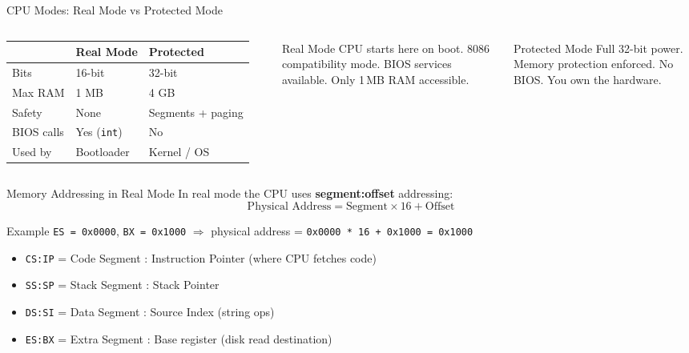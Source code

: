 \documentclass[aspectratio=169]{beamer}
\newcommand{\concept}[2]{%
  \begin{block}{#1}\smallskip #2\smallskip\end{block}\vspace{5pt}}
\begin{document}
\begin{frame}{CPU Modes: Real Mode vs Protected Mode}
  \begin{columns}[T]
    \begin{tabular}{lll}
      \toprule
      & \textbf{Real Mode} & \textbf{Protected}\\
      \midrule
      Bits        & 16-bit           & 32-bit\\
      Max RAM     & 1 MB             & 4 GB\\
      Safety      & None             & Segments + paging\\
      BIOS calls  & Yes (\texttt{int})& No\\
      Used by     & Bootloader       & Kernel / OS\\
      \bottomrule
    \end{tabular}
    \concept{Real Mode}{
      CPU starts here on boot. 8086 compatibility mode. BIOS services available. Only 1\,MB RAM accessible.
    }
    \concept{Protected Mode}{
      Full 32-bit power. Memory protection enforced. No BIOS. You own the hardware.
    }
  \end{columns}
\end{frame}

\begin{frame}{Memory Addressing in Real Mode}
  In real mode the CPU uses \textbf{segment:offset} addressing:
  \[
    \text{Physical Address} = \text{Segment} \times 16 + \text{Offset}
  \]
  \begin{exampleblock}{Example}
    \texttt{ES = 0x0000}, \texttt{BX = 0x1000} $\Rightarrow$ physical address = \texttt{0x0000 * 16 + 0x1000 = 0x1000}
  \end{exampleblock}
  \vspace{4pt}
  \begin{itemize}
    \item \texttt{CS:IP} = Code Segment : Instruction Pointer (where CPU fetches code)
    \item \texttt{SS:SP} = Stack Segment : Stack Pointer
    \item \texttt{DS:SI} = Data Segment : Source Index (string ops)
    \item \texttt{ES:BX} = Extra Segment : Base register (disk read destination)
  \end{itemize}
\end{frame}
\end{document}
